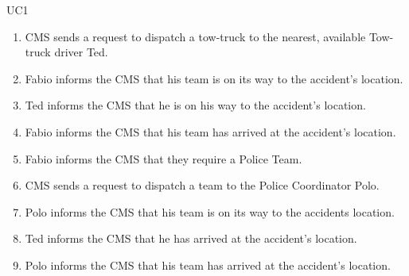 \begin{lyxlist}{UC1}
{\begin{enumerate}
  \item CMS sends a request to dispatch a tow-truck to the nearest, available
  Tow-truck driver Ted.
  \item Fabio informs the CMS that his team is on its way to the accident’s
  location.
  \item Ted informs the CMS that he is on his way to the accident’s location.
  \item Fabio informs the CMS that his team has arrived at the accident’s
  location.
  \item Fabio informs the CMS that they require a Police Team.
  \item CMS sends a request to dispatch a team to the Police Coordinator Polo.
  \item Polo informs the CMS that his team is on its way to the accidents
  location.
  \item Ted informs the CMS that he has arrived at the accident’s location.
  \item Polo informs the CMS that his team has arrived at the accident’s
  location.
\end{enumerate}
}  
\end{lyxlist}

